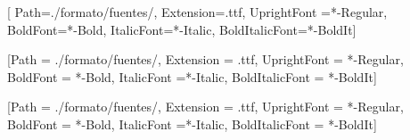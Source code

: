     \RequirePackage{fontspec}
    
    \setmainfont{Arial}[%
    Path=./formato/fuentes/,
    Extension=.ttf,
    UprightFont =*-Regular,
    BoldFont=*-Bold,
    ItalicFont=*-Italic,
    BoldItalicFont=*-BoldIt]
    
    [Path = ./formato/fuentes/,
    Extension = .ttf,
    UprightFont = *-Regular,
    BoldFont = *-Bold,
    ItalicFont =*-Italic,
    BoldItalicFont = *-BoldIt]
    
    [Path = ./formato/fuentes/,
    Extension = .ttf,
    UprightFont = *-Regular,
    BoldFont = *-Bold,
    ItalicFont =*-Italic,
    BoldItalicFont = *-BoldIt]
    
    \newcommand{\cambriamd}{\mdseries \cambria}
    \newcommand{\georgiamd}{\mdseries \georgia}
    \newcommand{\cambriab}{\bfseries \cambria}
    \newcommand{\georgiab}{\bfseries \georgia}

   
  